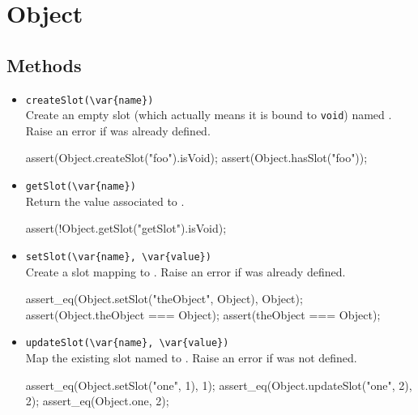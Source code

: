 \section{Object}

\subsection{Methods}

\begin{itemize}
\item \lstinline|createSlot(\var{name})|\\
  Create an empty slot (which actually means it is bound to
  \lstinline|void|) named .  Raise an error if 
  was already defined.
\begin{urbiscript}
assert(Object.createSlot("foo").isVoid);
assert(Object.hasSlot("foo"));
\end{urbiscript}

\item \lstinline|getSlot(\var{name})|\\
  Return the value associated to .
\begin{urbiscript}[firstnumber=last]
assert(!Object.getSlot("getSlot").isVoid);
\end{urbiscript}

\item \lstinline|setSlot(\var{name}, \var{value})|\\
  Create a slot  mapping to . Raise an error if
   was already defined.
\begin{urbiscript}[firstnumber=last]
assert_eq(Object.setSlot("theObject", Object), Object);
assert(Object.theObject === Object);
assert(theObject === Object);
\end{urbiscript}

\item \lstinline|updateSlot(\var{name}, \var{value})|\\
  Map the existing slot named  to . Raise an
  error if  was not defined.
\begin{urbiscript}[firstnumber=last]
assert_eq(Object.setSlot("one", 1), 1);
assert_eq(Object.updateSlot("one", 2), 2);
assert_eq(Object.one, 2);
\end{urbiscript}
\end{itemize}

